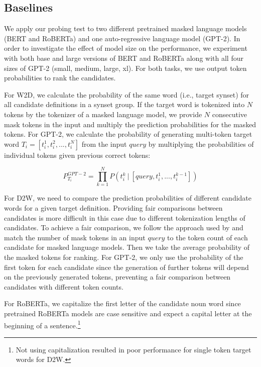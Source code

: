 \documentclass[11pt,a4paper]{article}
\begin{document}
\subsection{Baselines}

We apply our probing test to two different pretrained masked language models (BERT and RoBERTa) and one auto-regressive language model (GPT-2). In order to investigate the effect of model size on the performance, we experiment with both base and large versions of BERT and RoBERTa along with all four sizes of GPT-2 (small, medium, large, xl). For both tasks, we use output token probabilities to rank the candidates. 

For W2D, we calculate the probability of the same word (i.e., target synset) for all candidate definitions in a synset group. If the target word is tokenized into $N$ tokens by the tokenizer of a masked language model, we provide $N$ consecutive mask tokens in the input and multiply the prediction probabilities for the masked tokens. For GPT-2, we calculate the probability of generating multi-token target word $T_i = [t_i^1,t_i^2,...,t_i^N]$ from the input $query$ by multiplying the probabilities of individual tokens given previous correct tokens:

\begin{equation*}
    P_{T_i}^{GPT-2} = \prod\limits_{k=1}^N P(t_i^k~|~[query, t_i^{1},...,t_i^{k-1}])
\end{equation*}

For D2W, we need to compare the prediction probabilities of
different candidate words for a given target
definition. Providing fair comparisons between candidates is
more difficult in this case due to different tokenization
lengths of candidates. To achieve a fair comparison, we
follow the approach used by 
and match the number of mask tokens in an input $query$ to
the token count of each candidate for masked language
models. Then we take the  average probability of the masked tokens for ranking. For GPT-2, we only use the probability of the first token for each candidate since the generation of further tokens will depend on the previously generated tokens, preventing a fair comparison between candidates with different token counts.

For RoBERTa, we capitalize the first letter of the candidate
noun word since pretrained RoBERTa models are case sensitive
and expect a capital letter at the beginning of a
sentence.\footnote{Not using capitalization  resulted in
  poor performance for single token target words for D2W.}
\end{document}
